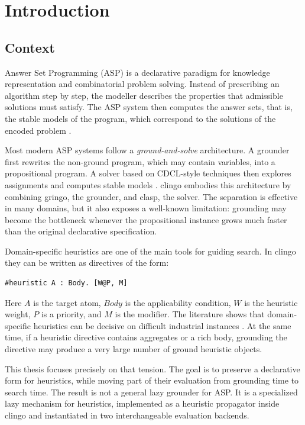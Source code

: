 \section{Introduction}

\subsection{Context}

Answer Set Programming (ASP) is a declarative paradigm for knowledge representation and combinatorial problem solving. Instead of prescribing an algorithm step by step, the modeller describes the properties that admissible solutions must satisfy. The ASP system then computes the answer sets, that is, the stable models of the program, which correspond to the solutions of the encoded problem \cite{gebser2012asp,clingoGuide}.

Most modern ASP systems follow a \textit{ground-and-solve} architecture. A grounder first rewrites the non-ground program, which may contain variables, into a propositional program. A solver based on CDCL-style techniques then explores assignments and computes stable models \cite{clingoGuide,moskewicz2001chaff}. clingo embodies this architecture by combining gringo, the grounder, and clasp, the solver. The separation is effective in many domains, but it also exposes a well-known limitation: grounding may become the bottleneck whenever the propositional instance grows much faster than the original declarative specification.

Domain-specific heuristics are one of the main tools for guiding search. In clingo they can be written as directives of the form:

\begin{verbatim}
#heuristic A : Body. [W@P, M]
\end{verbatim}

Here $A$ is the target atom, $Body$ is the applicability condition, $W$ is the heuristic weight, $P$ is a priority, and $M$ is the modifier. The literature shows that domain-specific heuristics can be decisive on difficult industrial instances \cite{gebser2013heuristics,dodaro2016combining}. At the same time, if a heuristic directive contains aggregates or a rich body, grounding the directive may produce a very large number of ground heuristic objects.

This thesis focuses precisely on that tension. The goal is to preserve a declarative form for heuristics, while moving part of their evaluation from grounding time to search time. The result is not a general lazy grounder for ASP. It is a specialized lazy mechanism for heuristics, implemented as a heuristic propagator inside clingo and instantiated in two interchangeable evaluation backends.

